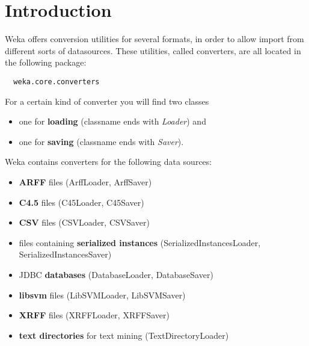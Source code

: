 %
%
%
%


\section{Introduction}
Weka offers conversion utilities for several formats, in order to allow import from different sorts of datasources. These utilities, called converters, are all located in the following package:

\begin{verbatim}
  weka.core.converters
\end{verbatim}

\noindent For a certain kind of converter you will find two classes

\begin{itemize}
	\item one for \textbf{loading} (classname ends with \textit{Loader}) and
	\item one for \textbf{saving} (classname ends with \textit{Saver}).
\end{itemize}

\noindent Weka contains converters for the following data sources:

\begin{itemize}
	\item \textbf{ARFF} files (ArffLoader, ArffSaver)
	\item \textbf{C4.5} files (C45Loader, C45Saver)
	\item \textbf{CSV} files (CSVLoader, CSVSaver)
	\item files containing \textbf{serialized instances} (SerializedInstancesLoader, SerializedInstancesSaver)
	\item JDBC \textbf{databases} (DatabaseLoader, DatabaseSaver)
	\item \textbf{libsvm} files (LibSVMLoader, LibSVMSaver)
	\item \textbf{XRFF} files (XRFFLoader, XRFFSaver)
	\item \textbf{text directories} for text mining (TextDirectoryLoader)
\end{itemize}

